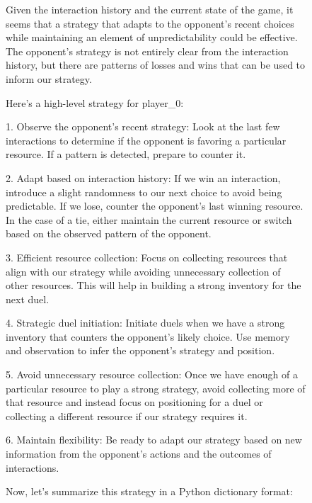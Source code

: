 \documentclass{article} %
\begin{document}
\begin{figure}[!t]
\centering
\begin{tcolorbox}[
title={\small \textbf{Example generated strategy for HE + HR playing rock bot}},
width=0.99\columnwidth]
\fontsize{7pt}{7pt}\selectfont
\ttfamily
Given the interaction history and the current state of the game, it seems that a strategy that adapts to the opponent's recent choices while maintaining an element of unpredictability could be effective. The opponent's strategy is not entirely clear from the interaction history, but there are patterns of losses and wins that can be used to inform our strategy.
\vspace{2mm}

Here's a high-level strategy for player\_0:

1. Observe the opponent's recent strategy: Look at the last few interactions to determine if the opponent is favoring a particular resource. If a pattern is detected, prepare to counter it.

2. Adapt based on interaction history: If we win an interaction, introduce a slight randomness to our next choice to avoid being predictable. If we lose, counter the opponent's last winning resource. In the case of a tie, either maintain the current resource or switch based on the observed pattern of the opponent.

3. Efficient resource collection: Focus on collecting resources that align with our strategy while avoiding unnecessary collection of other resources. This will help in building a strong inventory for the next duel.

4. Strategic duel initiation: Initiate duels when we have a strong inventory that counters the opponent's likely choice. Use memory and observation to infer the opponent's strategy and position.

5. Avoid unnecessary resource collection: Once we have enough of a particular resource to play a strong strategy, avoid collecting more of that resource and instead focus on positioning for a duel or collecting a different resource if our strategy requires it.

6. Maintain flexibility: Be ready to adapt our strategy based on new information from the opponent's actions and the outcomes of interactions.

\vspace{2mm}
Now, let's summarize this strategy in a Python dictionary format:


\end{tcolorbox}
\end{figure}
\end{document}
